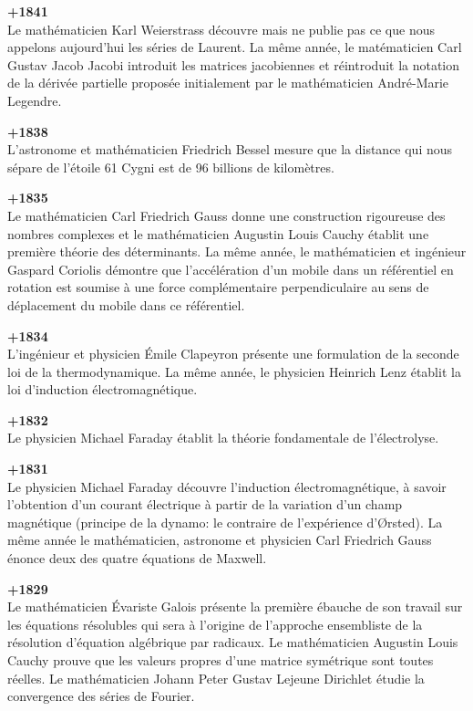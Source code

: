 \textbf{+1841}\\
Le mathématicien Karl Weierstrass découvre mais ne publie pas ce que nous appelons aujourd'hui les séries de Laurent. La même année, le matématicien Carl Gustav Jacob Jacobi introduit les matrices jacobiennes et réintroduit la notation de la dérivée partielle proposée initialement par le mathématicien André-Marie Legendre.

\textbf{+1838}\\
L'astronome et mathématicien Friedrich Bessel mesure que la distance qui nous sépare de l'étoile 61 Cygni est de 96 billions de kilomètres.

\textbf{+1835}\\
Le mathématicien Carl Friedrich Gauss donne une construction rigoureuse des nombres complexes et le mathématicien Augustin Louis Cauchy établit une première théorie des déterminants. La même année, le mathématicien et ingénieur Gaspard Coriolis démontre que l'accélération d'un mobile dans un référentiel en rotation est soumise à une force complémentaire perpendiculaire au sens de déplacement du mobile dans ce référentiel.

\textbf{+1834}\\
L'ingénieur et physicien Émile Clapeyron présente une formulation de la seconde loi de la thermodynamique. La même année, le physicien Heinrich Lenz établit la loi d'induction électromagnétique.

\textbf{+1832}\\
Le physicien Michael Faraday établit la théorie fondamentale de l'électrolyse.

\textbf{+1831}\\
Le physicien Michael Faraday découvre l'induction électromagnétique, à savoir l'obtention d'un courant électrique à partir de la variation d'un champ magnétique (principe de la dynamo: le contraire de l'expérience d'Ørsted). La même année le mathématicien, astronome et physicien Carl Friedrich Gauss énonce deux des quatre équations de Maxwell.

\textbf{+1829}\\
Le mathématicien Évariste Galois présente la première ébauche de son travail sur les équations résolubles qui sera à l'origine de l'approche ensembliste de la résolution d'équation algébrique par radicaux. Le mathématicien Augustin Louis Cauchy prouve que les valeurs propres d'une matrice symétrique sont toutes réelles. Le mathématicien Johann Peter Gustav Lejeune Dirichlet étudie la convergence des séries de Fourier.

